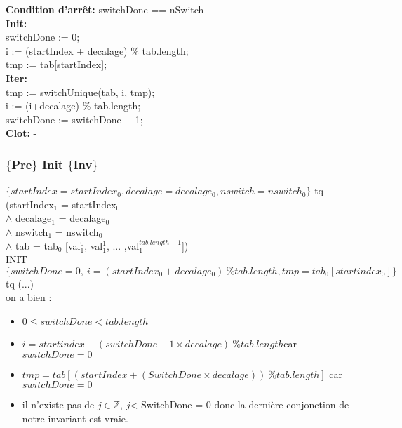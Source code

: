 \noindent \textbf{Condition d'arrêt:} switchDone == nSwitch\\

\noindent \textbf{Init:}\\
switchDone := 0;\\
i := (startIndex + decalage) \% tab.length;\\
tmp := tab[startIndex];\\

\noindent \textbf{Iter: }\\
tmp := switchUnique(tab, i, tmp);\\
i := (i+decalage) \% tab.length;\\
switchDone := switchDone + 1;\\

\noindent \textbf{Clot: } -\\



\subsubsection*{$\{$Pre$\}$ Init $\{$Inv$\}$}

$\{startIndex = startIndex_{0}, decalage = decalage_{0}, nswitch = nswitch_{0} \}$ tq (startIndex$_{1}$ = startIndex$_{0}$ \\
$\wedge$ decalage$_{1}$ = decalage$_{0}$\\
$\wedge$ nswitch$_{1}$ = nswitch$_{0}$\\
$\wedge$ tab = tab$_{0}$ [val$_{1}^{0}$, val$_{1}^{1}$, ... ,val$_{1}^{tab.length-1}$])\\

INIT \\

$\{switchDone = 0,\ i = (startIndex_0 + decalage_0)\ \% tab.length, tmp = tab_0[startindex_0]\}$ tq (...)\\
on a bien : 
\begin{itemize}
	\item $0\leq switchDone < tab.length$
	\item $i = startindex + (switchDone+1\times decalage)\ \% tab.length $car$ switchDone = 0$
	\item $tmp = tab[(startIndex + (SwitchDone\times decalage))\ \% tab.length]$ car $switchDone = 0$
	\item il n'existe pas de $j \in \mathbb{Z}$, $j$< SwitchDone = 0 donc la dernière conjonction de notre invariant est vraie. \\
\end{itemize}


